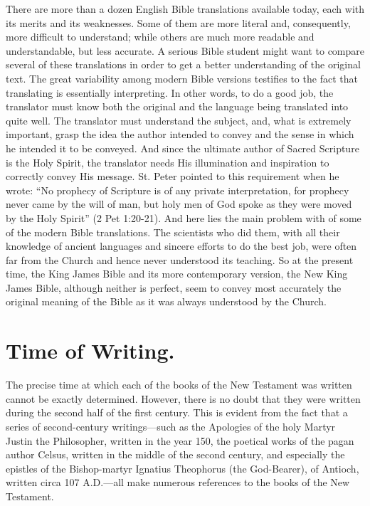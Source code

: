 There are more than a dozen English Bible translations available today, each with its merits and its weaknesses. Some of them are more literal and, consequently, more difficult to understand; while others are much more readable and understandable, but less accurate. A serious Bible student might want to compare several of these translations in order to get a better understanding of the original text. The great variability among modern Bible versions testifies to the fact that translating is essentially interpreting. In other words, to do a good job, the translator must know both the original and the language being translated into quite well. The translator must understand the subject, and, what is extremely important, grasp the idea the author intended to convey and the sense in which he intended it to be conveyed. And since the ultimate author of Sacred Scripture is the Holy Spirit, the translator needs His illumination and inspiration to correctly convey His message. St. Peter pointed to this requirement when he wrote: ``No prophecy of Scripture is of any private interpretation, for prophecy never came by the will of man, but holy men of God spoke as they were moved by the Holy Spirit'' (2 Pet 1:20-21). And here lies the main problem with of some of the modern Bible translations. The scientists who did them, with all their knowledge of ancient languages and sincere efforts to do the best job, were often far from the Church and hence never understood its teaching. So at the present time, the King James Bible and its more contemporary version, the New King James Bible, although neither is perfect, seem to convey most accurately the original meaning of the Bible as it was always understood by the Church.

\section{Time of Writing.}

The precise time at which each of the books of the New Testament was written cannot be exactly determined. However, there is no doubt that they were written during the second half of the first century. This is evident from the fact that a series of second-century writings---such as the Apologies of the holy Martyr Justin the Philosopher, written in the year 150, the poetical works of the pagan author Celsus, written in the middle of the second century, and especially the epistles of the Bishop-martyr Ignatius Theophorus (the God-Bearer), of Antioch, written circa 107 A.D.---all make numerous references to the books of the New Testament.

